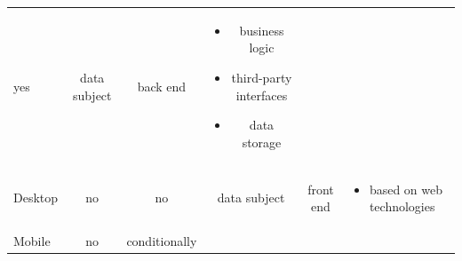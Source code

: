 \documentclass[12pt,english,a4paper,titlepage,cleardoublepage=empty,dottedtoc]{report}
\providecommand{\tightlist}{%
  \setlength{\itemsep}{0pt}\setlength{\parskip}{0pt}}
\begin{document}
\begin{longtable}[]{@{}lccccl@{}}
\begin{minipage}[t]{0.16\columnwidth}
yes\strut
\end{minipage} & \begin{minipage}[t]{0.16\columnwidth}\centering\strut
data subject\strut
\end{minipage} & \begin{minipage}[t]{0.16\columnwidth}\centering\strut
back end\strut
\end{minipage} & \begin{minipage}[t]{0.16\columnwidth}\raggedright\strut
\begin{itemize}
\tightlist
\item
  business logic
\item
  third-party interfaces
\item
  data storage
\end{itemize}\strut
\end{minipage}\tabularnewline
\begin{minipage}[t]{0.16\columnwidth}\raggedright\strut
Desktop\strut
\end{minipage} & \begin{minipage}[t]{0.16\columnwidth}\centering\strut
no\strut
\end{minipage} & \begin{minipage}[t]{0.16\columnwidth}\centering\strut
no\strut
\end{minipage} & \begin{minipage}[t]{0.16\columnwidth}\centering\strut
data subject\strut
\end{minipage} & \begin{minipage}[t]{0.16\columnwidth}\centering\strut
front end\strut
\end{minipage} & \begin{minipage}[t]{0.16\columnwidth}\raggedright\strut
\begin{itemize}
\tightlist
\item
  based on web technologies
\end{itemize}\strut
\end{minipage}\tabularnewline
\begin{minipage}[t]{0.16\columnwidth}\raggedright\strut
Mobile\strut
\end{minipage} & \begin{minipage}[t]{0.16\columnwidth}\centering\strut
no\strut
\end{minipage} & \begin{minipage}[t]{0.16\columnwidth}\centering\strut
conditionally\strut
\end{minipage} & \begin{minipage}[t]{0.16\columnwidth}\centering\strut

\end{minipage}
\end{longtable}
\end{document}
